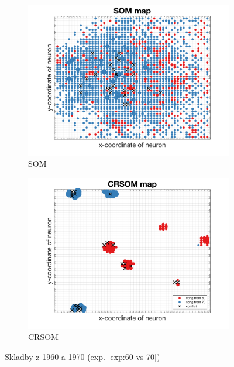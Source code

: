 \documentclass[thesis=M,czech]{FITthesis}[2012/06/26]
\begin{document}
\begin{figure}
\centering
\begin{subfigure}{.5\textwidth}
  \centering
  \includegraphics[width=.99\linewidth]{exp_60s70s_som.png}
  \caption{SOM}
  \label{fig:sub1}
\end{subfigure}%
\begin{subfigure}{.5\textwidth}
  \centering
  \includegraphics[width=.99\linewidth]{exp_60s70s_crsom.png}
  \caption{CRSOM}
  \label{fig:sub2}
\end{subfigure}
\caption{Skladby z 1960 a 1970 (exp. \ref{exp:60-vs-70}) }
\label{fig:top}
\end{figure}
\end{document}
